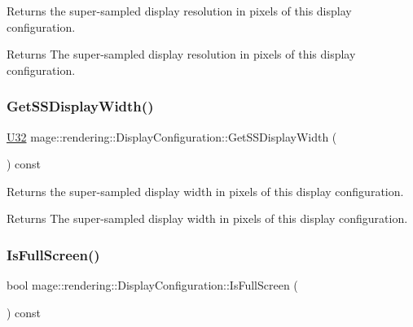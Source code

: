 Returns the super-\/sampled display resolution in pixels of this display configuration.

\begin{DoxyReturn}{Returns}
The super-\/sampled display resolution in pixels of this display configuration. 
\end{DoxyReturn}
\mbox{\label{classmage_1_1rendering_1_1_display_configuration_aac42c90d563c8ee7a2ae795c2750dc35}} 
\subsubsection{\texorpdfstring{Get\+S\+S\+Display\+Width()}{GetSSDisplayWidth()}}
{\footnotesize\ttfamily \mbox{\hyperlink{namespacemage_a41c104c036fba3756a74e19f793eeaa1}{U32}} mage\+::rendering\+::\+Display\+Configuration\+::\+Get\+S\+S\+Display\+Width (\begin{DoxyParamCaption}{ }\end{DoxyParamCaption}) const\hspace{0.3cm}{\ttfamily [noexcept]}}

Returns the super-\/sampled display width in pixels of this display configuration.

\begin{DoxyReturn}{Returns}
The super-\/sampled display width in pixels of this display configuration. 
\end{DoxyReturn}
\mbox{\label{classmage_1_1rendering_1_1_display_configuration_a507e755923af2ba1338cc041b5df8e0a}} 
\subsubsection{\texorpdfstring{Is\+Full\+Screen()}{IsFullScreen()}}
{\footnotesize\ttfamily bool mage\+::rendering\+::\+Display\+Configuration\+::\+Is\+Full\+Screen (\begin{DoxyParamCaption}{ }\end{DoxyParamCaption}) const\hspace{0.3cm}{\ttfamily [noexcept]}}

